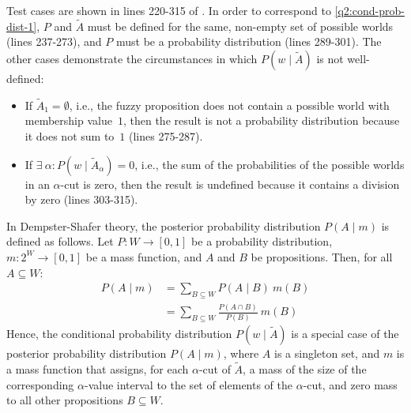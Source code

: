 \begin{samepage}
  Test cases are shown in lines 220-315 of .
  In order to correspond to \cref{q2:cond-prob-dist-1}, $P$ and $\tilde{A}$ must be
  defined for the same, non-empty set of possible worlds (lines 237-273), and $P$ must be
  a probability distribution (lines 289-301).
  The other cases demonstrate the circumstances in which $P(w \mid \tilde{A})$ is not well-defined:
  \begin{itemize}
    \item If $\tilde{A}_1 = \emptyset$, i.e., the fuzzy proposition does not contain a
          possible world with membership value~$1$, then the result is not a probability
          distribution because it does not sum to~$1$ (lines 275-287).
    \item If $\exists\ \alpha : P(w \mid \tilde{A}_\alpha) = 0$,
          i.e., the sum of the probabilities of the possible worlds in an $\alpha$-cut is
          zero, then the result is undefined because it contains a division by zero
          (lines 303-315).
  \end{itemize}
\end{samepage}

In Dempster-Shafer theory, the posterior probability distribution $P(A \mid m)$ is
defined as follows.
Let $P : W \to [0, 1]$ be a probability distribution, $m : 2^W \to [0, 1]$ be a mass
function, and $A$ and $B$ be propositions.
Then, for all $A \subseteq W$:
\begin{align}
  \label{q2:dempster-shafer-1}
  P(A \mid m)                  & = \sum_{B \subseteq W} P(A \mid B)\ m(B)
  \\[2ex]
  \label{q2:dempster-shafer-2} & = \sum_{B \subseteq W} \frac{P(A \cap B)}{P(B)}\ m(B)
\end{align}
Hence, the conditional probability distribution $P(w \mid \tilde{A})$ is a
special case of the posterior probability distribution $P(A \mid m)$, where $A$ is a
singleton set, and $m$ is a mass function that assigns, for each $\alpha$-cut of
$\tilde{A}$, a mass of the size of the corresponding $\alpha$-value interval to the set
of elements of the $\alpha$-cut, and zero mass to all other propositions $B \subseteq
  W$.
